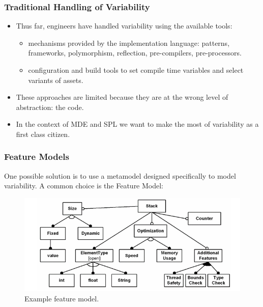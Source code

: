 \documentclass{beamer}
\begin{document}
\begin{frame}
\frametitle{Traditional Handling of Variability}

\begin{itemize}

\item Thus far, engineers have handled variability using the available
  tools:

  \begin{itemize}

  \item mechanisms provided by the implementation language: patterns,
    frameworks, polymorphism, reflection, pre-compilers,
    pre-processors.

    \pause

  \item configuration and build tools to set compile time variables
    and select variants of assets.

  \end{itemize}

  \pause

\item These approaches are limited because they are at the wrong level
  of abstraction: the code.

\pause

\item In the context of \ac{MDE} and \ac{SPL} we want to make the most
  of variability as a first class citizen.

\end{itemize}

\end{frame}

\begin{frame}
\frametitle{Feature Models}

One possible solution is to use a metamodel designed specifically to
model variability. A common choice is the Feature Model:

\begin{figure}
  \centering
  \includegraphics[scale=0.4]{images/example_feature_model_voelter.png}
  \caption{Example feature model.\cite{czarnecki2000generative}}
\end{figure}

\end{frame}
\end{document}
